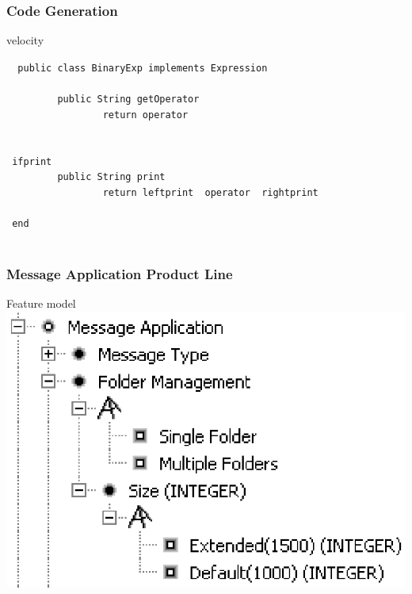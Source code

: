 \documentclass[xcolor=svgnames]{beamer}
\begin{document}
\begin{frame}[fragile]
\frametitle{Code Generation}

\begin{block}{velocity}
\end{block}
\begin{small}
\begin{tabbing}\tt
~public~class~BinaryExp~implements~Expression~\\
\tt ~~~~~~~~~\\
\tt ~~~~~~~~~public~String~getOperator~\\
\tt ~~~~~~~~~~~~~~~~~return~operator\\
\tt ~~~~~~~~~\\
\tt ~~~~~~~~~\\
\tt ~ifprint\\
\tt ~~~~~~~~~public~String~print~\\
\tt ~~~~~~~~~~~~~~~~~return~leftprint~~operator~~rightprint\\
\tt ~~~~~~~~~\\
\tt ~end\\
\tt ~
\end{tabbing}
\end{small}
\end{frame}



\begin{frame}
\frametitle{Message Application Product Line}

\begin{block}{Feature model}
\includegraphics[scale=0.5]{img/fm03.eps}
\end{block}
\end{frame}
\end{document}
